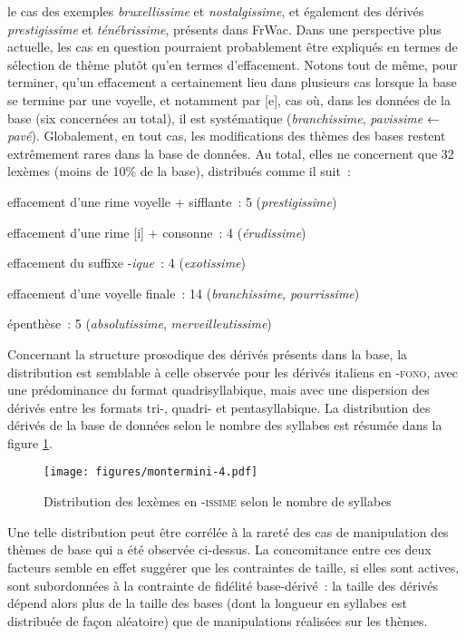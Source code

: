 \documentclass[output=paper]{langsci/langscibook}
\begin{document}
le cas des exemples \emph{bruxellissime} et \emph{nostalgissime}, et
également des dérivés \emph{prestigissime} et \emph{ténébrissime},
présents dans FrWac. Dans une perspective plus actuelle, les cas en
question pourraient probablement être expliqués en termes de sélection
de thème plutôt qu'en termes d'effacement. Notons tout de même, pour
terminer, qu'un effacement a certainement lieu dans plusieurs cas
lorsque la base se termine par une voyelle, et notamment par {[}e{]}, cas
où, dans les données de la base (six concernées au total), il est
systématique (\emph{branchissime}, \emph{pavissime} ← \emph{pavé}).
Globalement, en tout cas, les modifications des thèmes des bases restent
extrêmement rares dans la base de données. Au total, elles ne concernent
que 32 lexèmes (moins de 10\% de la base), distribués comme il suit~:
\largerpage

\ea \label{ex:Montermini:12}


        \ea \label{ex:Montermini:12a}effacement d'une rime voyelle + sifflante~: 5
(\emph{prestigissime})

      \ex \label{ex:Montermini:12b} effacement d'une rime {[}i{]} + consonne~: 4 (\emph{érudissime})

      \ex \label{ex:Montermini:12c} effacement du suffixe -\emph{ique~}: 4 (\emph{exotissime})

      \ex \label{ex:Montermini:12d} effacement d'une voyelle finale~: 14 (\emph{branchissime},
\emph{pourrissime})

      \ex \label{ex:Montermini:12e} épenthèse~: 5 (\emph{absolutissime}, \emph{merveilleutissime})
\z\z

Concernant la structure prosodique des dérivés présents dans la base, la
distribution est semblable à celle observée pour les dérivés italiens en
-\textsc{fono}, avec une prédominance du format quadrisyllabique, mais
avec une dispersion des dérivés entre les formats \mbox{tri-,} quadri- et
pentasyllabique. La distribution des dérivés de la base de données selon
le nombre des syllabes est résumée dans la figure \ref{fig:Montermini:4}.

\begin{figure} 
\texttt{[image: figures/montermini-4.pdf]}
\caption{Distribution des lexèmes en \textsc{-issime} selon le
nombre de syllabes}
\label{fig:Montermini:4}
\end{figure}


Une telle distribution peut être corrélée à la rareté des cas de
manipulation des thèmes de base qui a été observée ci-dessus. La
concomitance entre ces deux facteurs semble en effet suggérer que les
contraintes de taille, si elles sont actives, sont subordonnées à la
contrainte de fidélité base-dérivé~: la taille des dérivés dépend alors
plus de la taille des bases (dont la longueur en syllabes est distribuée
de façon aléatoire) que de manipulations réalisées sur les thèmes.
\end{document}
